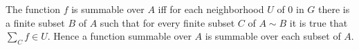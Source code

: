 The function $f$ is summable over $A$ iff for each neighborhood $U$ of $0$ in $G$ there is a finite subset $B$ of $A$ such that for every finite subset $C$ of $A \sim B$ it is true that $\sum_C f \in U$. Hence a function summable over $A$ is summable over each subset of $A$.
